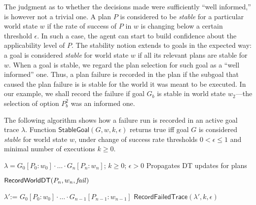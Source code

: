 \newcommand{\procedurefont}[1]{\mathsf{#1}}
\newcommand{\StableGoal}{\procedurefont{StableGoal}}
\newcommand{\RecordTrace}{\procedurefont{RecordFailedTrace}}
\newcommand{\RecordWorldDT}{\procedurefont{RecordWorldDT}}


The judgment as to whether the decisions made were sufficiently ``well
informed,'' is however not a trivial one.  A plan $P$ is considered to be
\emph{stable} for a particular world state $w$ if the rate of success of $P$ in
$w$ is changing below a certain threshold $\epsilon$.
In such a case, the agent can start to build confidence about the applicability
level of $P$.
The stability notion extends to goals in the expected way: a goal is considered
\emph{stable} for world state $w$ if all its relevant plans are stable for $w$. 
When a goal is stable, we regard the plan selection for such goal as a ``well
informed'' one. Thus, a plan failure is recorded in the plan if the subgoal
that caused the plan failure is is stable for the world it was meant to be
executed. In our example, we shall record the failure if goal $G_b$ is stable
in world state $w_2$---the selection of option $P_b^2$ was an informed one.

The following algorithm shows how a failure run is recorded in an active goal
trace $\lambda$. Function $\StableGoal(G,w,k,\epsilon)$ returns true iff goal $G$
is considered \textit{stable} for world state $w$, under change of success rate
thresholds $0 < \epsilon \leq 1$ and minimal number of executions $k \geq 0$.
 
 \renewcommand{\algorithmiccomment}[1]{\hfill \texttt{\small // #1}}
 \newcommand{\assign}{\mbox{:=\ }}
 \begin{algorithm}[h]
	\caption{$\RecordTrace(\lambda,k,\epsilon)$}\label{algo:record_failed_exec}
	\label{alg:NDS}
  \begin{algorithmic}[1]
    \REQUIRE $\lambda=G_0[P_0:w_0] \cdot \ldots \cdot G_n[P_n:w_n]$; $k\geq0$;
    $\epsilon > 0$ \ENSURE Propagates DT updates for plans

	\STATE $\RecordWorldDT(P_n,w_n,\failure)$

    \IF{$\StableGoal(G_n,w_n,k,\epsilon) \land |\lambda|>1$}
    	 \STATE $\lambda' \assign G_0[P_0:w_0] \cdot \ldots \cdot
    				G_{n-1}[P_{n-1}:w_{n-1}]$
    	\STATE $\RecordTrace(\lambda',k,\epsilon)$ 
    \ENDIF
  \end{algorithmic}
\end{algorithm}

